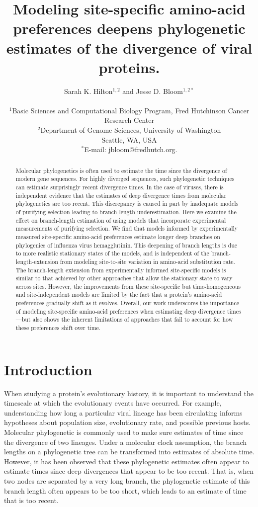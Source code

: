 \documentclass[11pt]{article}
\title{Modeling site-specific amino-acid preferences deepens phylogenetic estimates of the divergence of viral proteins.}
\author
{Sarah K. Hilton$^{1,2}$  and Jesse D. Bloom$^{1,2*}$\\
\\
\footnotesize{$^1$Basic Sciences and Computational Biology Program, Fred Hutchinson Cancer Research Center}\\
\footnotesize{$^2$Department of Genome Sciences, University of Washington}\\
\footnotesize{Seattle, WA, USA}\\
\footnotesize{$^*$E-mail:  jbloom@fredhutch.org.}\\
}
\date{}
\begin{document}
 


\maketitle 


\begin{abstract}
\noindent  
Molecular phylogenetics is often used to estimate the time since the divergence of modern gene sequences.
For highly diverged sequences, such phylogenetic techniques can estimate surprisingly recent divergence times. 
In the case of viruses, there is independent evidence that the estimates of deep divergence times from molecular phylogenetics are too recent.
This discrepancy is caused in part by inadequate models of purifying selection leading to branch-length underestimation.
Here we examine the effect on branch-length estimation of using models that incorporate experimental measurements of purifying selection.
We find that models informed by experimentally measured site-specific amino-acid preferences estimate longer deep branches on phylogenies of influenza virus hemagglutinin.
This deepening of branch lengths is due to more realistic stationary states of the models, and is independent of the branch-length-extension from modeling site-to-site variation in amino-acid substitution rate.
The branch-length extension from experimentally informed site-specific models is similar to that achieved by other approaches that allow the stationary state to vary across sites.
However, the improvements from these site-specific but time-homogeneous and site-independent models are limited by the fact that a protein's amino-acid preferences gradually shift as it evolves.
Overall, our work underscores the importance of modeling site-specific amino-acid preferences when estimating deep divergence times---but also shows the inherent limitations of approaches that fail to account for how these preferences shift over time. 
\end{abstract}

\clearpage

\section*{Introduction} 

When studying a protein's evolutionary history, it is important to understand the timescale at which the evolutionary events have occurred. 
For example, understanding how long a particular viral lineage has been circulating informs hypotheses about population size, evolutionary rate, and possible previous hosts. Molecular phylogenetic is commonly used to make sure estimates of time since the divergence of two lineages. 
Under a molecular clock assumption, the branch lengths on a phylogenetic tree can be transformed into estimates of absolute time. 
However, it has been observed that these phylogenetic estimates often appear to estimate times since deep divergences that appear to be too recent. 
That is, when two nodes are separated by a very long branch, the phylogenetic estimate of this branch length often appears to be too short, which leads to an estimate of time that is too recent. 
\end{document}
